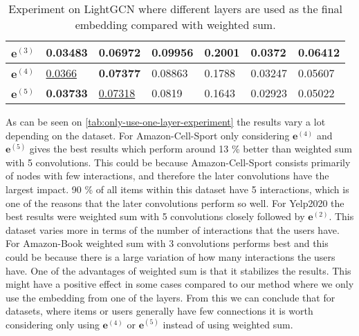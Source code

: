\begin{table*}[]
\begin{tabular}{|l|l|l|l|l|l|l|}
        $\mathbf{e}^{(3)}$   & 0.03483                                & 0.06972                       & 0.09956                          & 0.2001            & 0.0372              & 0.06412             \\ \hline
        $\mathbf{e}^{(4)}$   & \underline{0.0366}                     & \textbf{0.07377}              & 0.08863                          & 0.1788            & 0.03247             & 0.05607             \\ \hline
        $\mathbf{e}^{(5)}$   & \textbf{0.03733}                       & \underline{0.07318}           & 0.0819                           & 0.1643            & 0.02923             & 0.05022             \\ \hline
    \end{tabular}
    \centering
    \caption{Experiment on LightGCN where different layers are used as the final embedding compared with weighted sum.}
    \label{tab:only-use-one-layer-experiment}
\end{table*}
As can be seen on \autoref{tab:only-use-one-layer-experiment} the results vary a lot depending on the dataset.
For Amazon-Cell-Sport only considering $\mathbf{e}^{(4)}$ and $\mathbf{e}^{(5)}$ gives the best results which perform around 13 \% better than weighted sum with 5 convolutions.
This could be because Amazon-Cell-Sport consists primarily of nodes with few interactions, and therefore the later convolutions have the largest impact. 
90 \% of all items within this dataset have 5 interactions, which is one of the reasons that the later convolutions perform so well.
For Yelp2020 the best results were weighted sum with 5 convolutions closely followed by $\mathbf{e}^{(2)}$.
This dataset varies more in terms of the number of interactions that the users have.
For Amazon-Book weighted sum with 3 convolutions performs best and this could be because there is a large variation of how many interactions the users have.
One of the advantages of weighted sum is that it stabilizes the results.
This might have a positive effect in some cases compared to our method where we only use the embedding from one of the layers.
From this we can conclude that for datasets, where items or users generally have few connections it is worth considering only using $\mathbf{e}^{(4)}$ or $\mathbf{e}^{(5)}$ instead of using weighted sum.

